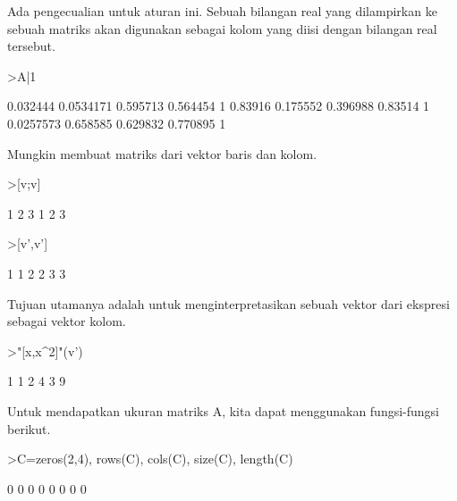 \documentclass[12pt,arial,letterpaper]{book}
\begin{document}
\begin{eulercomment}
\begin{eulercomment}
\begin{eulercomment}
\begin{eulercomment}
\begin{eulercomment}
Ada pengecualian untuk aturan ini. Sebuah bilangan real yang
dilampirkan ke sebuah matriks akan digunakan sebagai kolom yang diisi
dengan bilangan real tersebut.
\end{eulercomment}
\begin{eulerprompt}
>A|1
\end{eulerprompt}
\begin{euleroutput}
       0.032444     0.0534171      0.595713      0.564454             1 
        0.83916      0.175552      0.396988       0.83514             1 
      0.0257573      0.658585      0.629832      0.770895             1 
\end{euleroutput}
\begin{eulercomment}
Mungkin membuat matriks dari vektor baris dan kolom.
\end{eulercomment}
\begin{eulerprompt}
>[v;v]
\end{eulerprompt}
\begin{euleroutput}
              1             2             3 
              1             2             3 
\end{euleroutput}
\begin{eulerprompt}
>[v',v']
\end{eulerprompt}
\begin{euleroutput}
              1             1 
              2             2 
              3             3 
\end{euleroutput}
\begin{eulercomment}
Tujuan utamanya adalah untuk menginterpretasikan sebuah vektor dari
ekspresi sebagai vektor kolom.
\end{eulercomment}
\begin{eulerprompt}
>"[x,x^2]"(v')
\end{eulerprompt}
\begin{euleroutput}
              1             1 
              2             4 
              3             9 
\end{euleroutput}
\begin{eulercomment}
Untuk mendapatkan ukuran matriks A, kita dapat menggunakan
fungsi-fungsi berikut.
\end{eulercomment}
\begin{eulerprompt}
>C=zeros(2,4), rows(C), cols(C), size(C), length(C)
\end{eulerprompt}
\begin{euleroutput}
              0             0             0             0 
              0             0             0             0 

\end{euleroutput}
\end{eulercomment}
\end{eulercomment}
\end{eulercomment}
\end{eulercomment}
\end{document}
